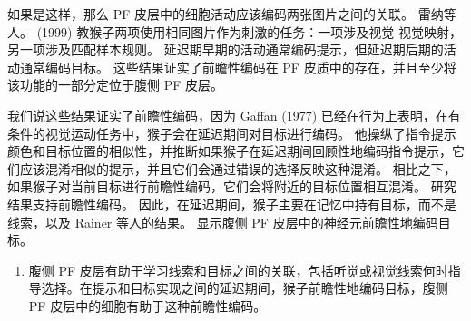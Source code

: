 如果是这样，那么 PF 皮层中的细胞活动应该编码两张图片之间的关联。 雷纳等人。 (1999) 教猴子两项使用相同图片作为刺激的任务：一项涉及视觉-视觉映射，另一项涉及匹配样本规则。 延迟期早期的活动通常编码提示，但延迟期后期的活动通常编码目标。 这些结果证实了前瞻性编码在 PF 皮质中的存在，并且至少将该功能的一部分定位于腹侧 PF 皮层。
\par
我们说这些结果证实了前瞻性编码，因为 Gaffan (1977) 已经在行为上表明，在有条件的视觉运动任务中，猴子会在延迟期间对目标进行编码。 他操纵了指令提示颜色和目标位置的相似性，并推断如果猴子在延迟期间回顾性地编码指令提示，它们应该混淆相似的提示，并且它们会通过错误的选择反映这种混淆。 相比之下，如果猴子对当前目标进行前瞻性编码，它们会将附近的目标位置相互混淆。 研究结果支持前瞻性编码。 因此，在延迟期间，猴子主要在记忆中持有目标，而不是线索，以及 Rainer 等人的结果。 显示腹侧 PF 皮层中的神经元前瞻性地编码目标。
\begin{enumerate}
\par
\item 腹侧 PF 皮层有助于学习线索和目标之间的关联，包括听觉或视觉线索何时指导选择。在提示和目标实现之间的延迟期间，猴子前瞻性地编码目标，腹侧 PF 皮层中的细胞有助于这种前瞻性编码。
\end{enumerate}
